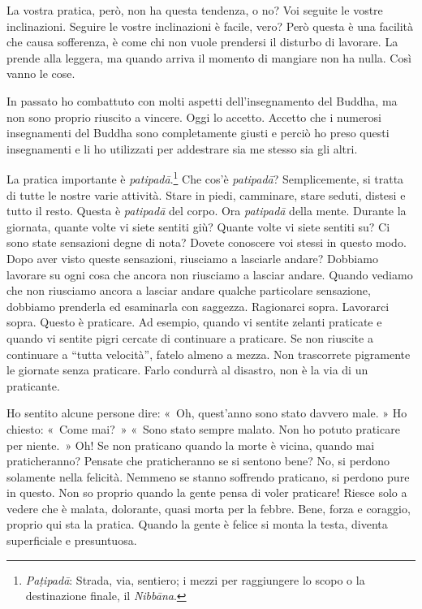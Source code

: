 La vostra pratica, però, non ha questa tendenza, o no? Voi seguite le
vostre inclinazioni. Seguire le vostre inclinazioni è facile, vero? Però
questa è una facilità che causa sofferenza, è come chi non vuole
prendersi il disturbo di lavorare. La prende alla leggera, ma quando
arriva il momento di mangiare non ha nulla. Così vanno le cose.

In passato ho combattuto con molti aspetti dell'insegnamento del Buddha,
ma non sono proprio riuscito a vincere. Oggi lo accetto. Accetto che i
numerosi insegnamenti del Buddha sono completamente giusti e perciò ho
preso questi insegnamenti e li ho utilizzati per addestrare sia me
stesso sia gli altri.

La pratica importante è \emph{patipadā}.\footnote{\emph{Paṭipadā}:
  Strada, via, sentiero; i mezzi per raggiungere lo scopo o la
  destinazione finale, il \emph{Nibbāna}.} Che cos'è \emph{patipadā}?
Semplicemente, si tratta di tutte le nostre varie attività. Stare in
piedi, camminare, stare seduti, distesi e tutto il resto. Questa è
\emph{patipadā} del corpo. Ora \emph{patipadā} della mente. Durante la
giornata, quante volte vi siete sentiti giù? Quante volte vi siete
sentiti su? Ci sono state sensazioni degne di nota? Dovete conoscere voi
stessi in questo modo. Dopo aver visto queste sensazioni, riusciamo a
lasciarle andare? Dobbiamo lavorare su ogni cosa che ancora non
riusciamo a lasciar andare. Quando vediamo che non riusciamo ancora a
lasciar andare qualche particolare sensazione, dobbiamo prenderla ed
esaminarla con saggezza. Ragionarci sopra. Lavorarci sopra. Questo è
praticare. Ad esempio, quando vi sentite zelanti praticate e quando vi
sentite pigri cercate di continuare a praticare. Se non riuscite a
continuare a ``tutta velocità'', fatelo almeno a mezza. Non trascorrete
pigramente le giornate senza praticare. Farlo condurrà al disastro, non
è la via di un praticante.

Ho sentito alcune persone dire: «~Oh, quest'anno sono stato davvero
male. » Ho chiesto: «~Come mai?~» «~Sono stato sempre malato. Non ho
potuto praticare per niente.~» Oh! Se non praticano quando la morte è
vicina, quando mai praticheranno? Pensate che praticheranno se si
sentono bene? No, si perdono solamente nella felicità. Nemmeno se stanno
soffrendo praticano, si perdono pure in questo. Non so proprio quando la
gente pensa di voler praticare! Riesce solo a vedere che è malata,
dolorante, quasi morta per la febbre. Bene, forza e coraggio, proprio
qui sta la pratica. Quando la gente è felice si monta la testa, diventa
superficiale e presuntuosa.

